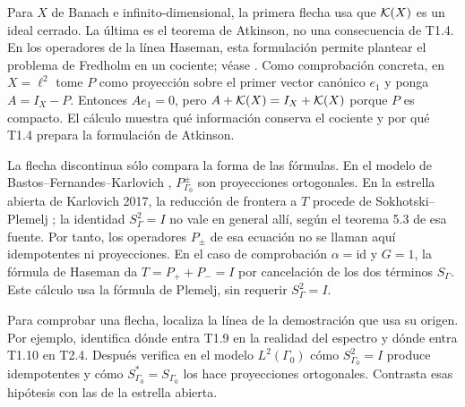 \noindent Para $X$ de Banach e infinito-dimensional, la primera flecha usa que $\mathcal K(X)$ es un ideal cerrado. La última es el teorema de
Atkinson, no una consecuencia de T1.4. En los operadores de la línea Haseman, esta formulación
permite plantear el problema de Fredholm en un cociente; véase
\cite[p.~2]{Karlovich2025}.
Como comprobación concreta, en $X=\ell^2$ tome $P$ como proyección
sobre el primer vector canónico $e_1$ y ponga $A=I_X-P$.
Entonces $A e_1=0$, pero
$A+\mathcal K(X)=I_X+\mathcal K(X)$ porque $P$ es compacto. El cálculo muestra qué
información conserva el cociente y por qué T1.4 prepara la formulación
de Atkinson.

\begin{center}
\end{center}

\noindent La flecha discontinua sólo compara la forma de las fórmulas.
En el modelo de Bastos--Fernandes--Karlovich \cite[§2, p.~22]{BFK2006},
$P_{\Gamma_0}^\pm$ son proyecciones ortogonales. En la estrella abierta de
Karlovich 2017, la reducción de frontera a $T$ procede de
Sokhotski--Plemelj \cite[pp.~463--464]{Karlovich2017}; la identidad
$S_\Gamma^2=I$ no vale en general allí, según el teorema 5.3 de esa fuente.
Por tanto, los operadores $P_\pm$ de esa ecuación no se llaman aquí
idempotentes ni proyecciones.
En el caso de comprobación $\alpha=\mathrm{id}$ y $G=1$, la fórmula de
Haseman da $T=P_++P_-=I$ por cancelación de los dos términos $S_\Gamma$.
Este cálculo usa la fórmula de Plemelj, sin requerir $S_\Gamma^2=I$.

\begin{reflection}
Para comprobar una flecha, localiza la línea de la demostración que usa su origen. Por ejemplo,
identifica dónde entra T1.9 en la realidad del espectro y dónde entra T1.10 en T2.4. Después
verifica en el modelo $L^2(\Gamma_0)$ cómo $S_{\Gamma_0}^2=I$ produce
idempotentes y cómo $S_{\Gamma_0}^*=S_{\Gamma_0}$ los hace proyecciones
ortogonales. Contrasta esas hipótesis con las de la estrella abierta.
\end{reflection}
